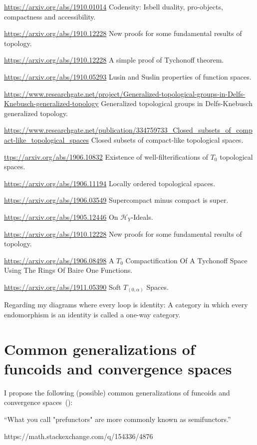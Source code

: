\documentclass{amsart}
\begin{document}
\url{https://arxiv.org/abs/1910.01014} Codensity: Isbell duality, pro-objects, compactness and accessibility.

\url{https://arxiv.org/abs/1910.12228} New proofs for some fundamental results of topology.

\url{https://arxiv.org/abs/1910.12228} A simple proof of Tychonoff theorem.

\url{https://arxiv.org/abs/1910.05293} Lusin and Suslin properties of function spaces.

\url{https://www.researchgate.net/project/Generalized-topological-groups-in-Delfs-Knebusch-generalized-topology}
Generalized topological groups in Delfs-Knebusch generalized topology.

\url{https://www.researchgate.net/publication/334759733_Closed_subsets_of_compact-like_topological_spaces}
Closed subsets of compact-like topological spaces.

\url{ttps://arxiv.org/abs/1906.10832} Existence of well-filterifications of $T_0$ topological spaces.

\url{https://arxiv.org/abs/1906.11194} Locally ordered topological spaces.

\url{https://arxiv.org/abs/1906.03549} Supercompact minus compact is super.

\url{https://arxiv.org/abs/1905.12446} On $\mathcal{H}_Y$-Ideals.

\url{https://arxiv.org/abs/1910.12228} New proofs for some fundamental results of topology.

\url{https://arxiv.org/abs/1906.08498} A $T_0$ Compactification Of A Tychonoff Space Using The Rings Of Baire One
  Functions.

\url{https://arxiv.org/abs/1911.05390} Soft $T_{(0,\alpha)}$ Spaces.

Regarding my diagrams where every loop is identity:
A category in which every endomorphism is an identity is called a one-way category.

\section{Common generalizations of funcoids and convergence spaces}

I propose the following (possible) common generalizations of funcoids and convergence spaces~(\cite{converg}):

``What you call "prefunctors" are more commonly known as semifunctors.''

https://math.stackexchange.com/q/154336/4876
\end{document}

